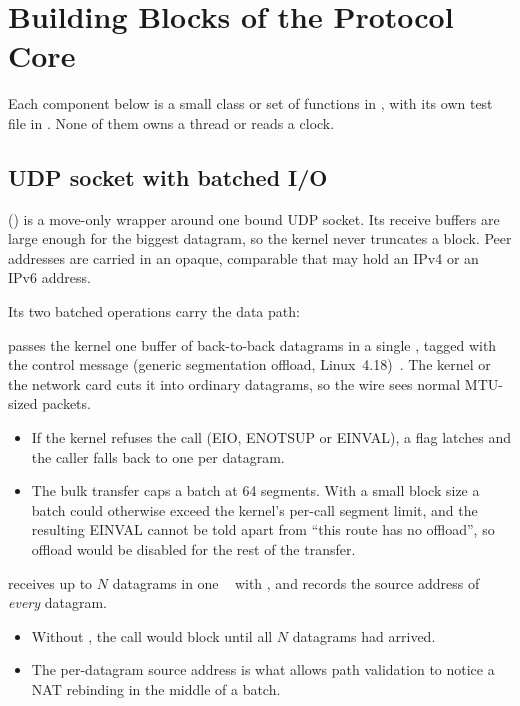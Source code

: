 \chapter{Building Blocks of the Protocol Core}\label{ch:components}

Each component below is a small class or set of functions in , with its own test file
in . None of them owns a thread or reads a clock.

\section{UDP socket with batched I/O}\label{sec:udp}

 () is a move-only wrapper around one bound UDP socket. Its receive buffers are
large enough for the biggest datagram, so the kernel never truncates a block. Peer addresses are carried in an
opaque, comparable  that may hold an IPv4 or an IPv6 address.

Its two batched operations carry the data path:

\begin{description}[style=nextline,leftmargin=1.2cm]
  \item[\code{send_segmented}] passes the kernel one buffer of back-to-back datagrams in a single
    , tagged with the  control message (generic segmentation offload,
    Linux~4.18)~\cite{gso}. The kernel or the network card cuts it into ordinary datagrams, so the wire sees
    normal MTU-sized packets.
    \begin{itemize}
      \item If the kernel refuses the call (EIO, ENOTSUP or EINVAL), a flag latches and the caller falls back to
        one  per datagram.
      \item The bulk transfer caps a batch at 64 segments. With a small block size a batch could otherwise
        exceed the kernel's per-call segment limit, and the resulting EINVAL cannot be told apart from ``this
        route has no offload'', so offload would be disabled for the rest of the transfer.
    \end{itemize}
  \item[\code{recv_batch}] receives up to $N$ datagrams in one ~\cite{recvmmsg} with
    , and records the source address of \emph{every} datagram.
    \begin{itemize}
      \item Without , the call would block until all $N$ datagrams had arrived.
      \item The per-datagram source address is what allows path validation to notice a NAT rebinding in the
        middle of a batch.
    \end{itemize}
\end{description}


